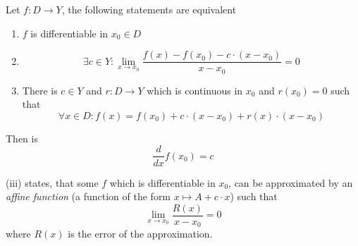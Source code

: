\begin{proposition}
   Let \(f: D \to Y\), the following statements are equivalent
   \begin{enumerate}[label=\roman*, align=Center]
      \item \(f\) is differentiable in \(x_0 \in D\)
      \item
         \[\exists c \in Y: \lim_{x \to x_0} \frac{f(x) - f(x_0) - c \cdot (x - x_0)}{x - x_0} = 0\]
      \item There is \(c \in Y\) and \(r: D \to Y\) which is continuous in \(x_0\) and \(r(x_0) = 0\) such that
         \[\forall x \in D: f(x) = f(x_0) + c \cdot (x - x_0) + r(x) \cdot (x - x_0)\]
   \end{enumerate}
   Then is
   \[\frac{d}{dx}f(x_0) = c\]
\end{proposition}
\begin{remark}[Intuition]
   (iii) states, that some \(f\) which is differentiable in \(x_0\), can be approximated by an \emph{affine function} (a function of the form \(x \mapsto A + c \cdot x\)) such that
   \[\lim_{x \to x_0} \frac{R(x)}{x - x_0} = 0\]
   where \(R(x)\) is the error of the approximation.
\end{remark}
